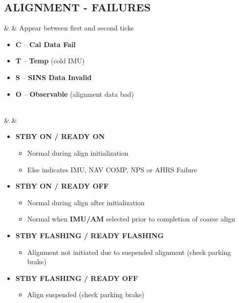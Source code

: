 \documentclass[fontInter]{TechCheck}
\begin{document}
	\subsection{ALIGNMENT - FAILURES}

	\begin{listlongtable}
		\textbf{\textbullet} &  & Appear between first and second ticks
		\begin{minipage}[t]{\linewidth}
			\begin{itemize}
				\item \textbf{C} -- \textbf{Cal Data Fail}
				\item \textbf{T} -- \textbf{Temp} (cold IMU)
				\item \textbf{S} -- \textbf{SINS Data Invalid}
				\item \textbf{O} -- \textbf{Observable} (alignment data bad)
			\end{itemize}
		\end{minipage} \\
		\midrule
		\textbf{\textbullet} &  &
		\begin{minipage}[t]{\linewidth}
			\vspace{-7pt}
			\begin{itemize}
				\item \textbf{STBY ON / READY ON}
				\begin{itemize}
					\item Normal during align initialization
					\item Else indicates IMU, NAV COMP, NPS or AHRS Failure
				\end{itemize}
				\item \textbf{STBY ON / READY OFF}
				\begin{itemize}
					\item Normal during align after initialization
					\item Normal when \textbf{IMU/AM} selected prior to completion of coarse align
				\end{itemize}
				\item \textbf{STBY FLASHING / READY FLASHING}
				\begin{itemize}
					\item Alignment not initiated due to suspended alignment (check parking brake)
				\end{itemize}
				\item \textbf{STBY FLASHING / READY OFF}
				\begin{itemize}
					\item Align suspended (check parking brake)

\end{itemize}
\end{itemize}
\end{minipage}
\end{listlongtable}
\end{document}
